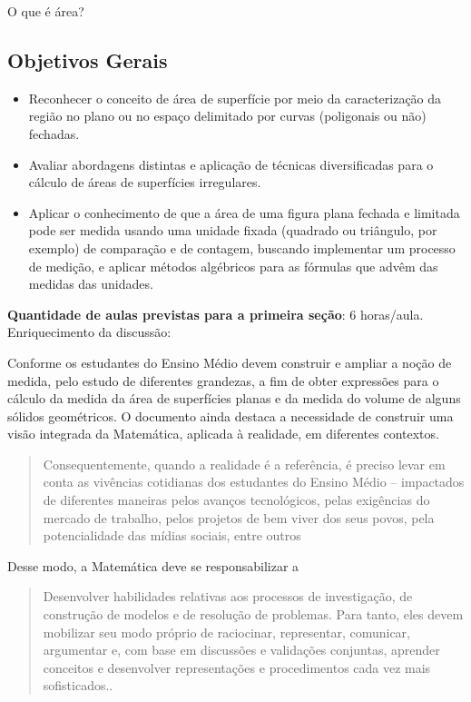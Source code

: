 \begin{paginatexto}{O que é área?}
\subsection{Objetivos Gerais}

\begin{itemize}
\item Reconhecer o conceito de área de superfície por meio da caracterização da região no plano ou no espaço delimitado por curvas (poligonais ou não) fechadas.
\item Avaliar abordagens distintas e aplicação de técnicas diversificadas para o cálculo de áreas de superfícies irregulares.
\item Aplicar o conhecimento de que a área de uma figura plana fechada e limitada pode ser medida usando uma unidade fixada (quadrado ou triângulo, por exemplo) de comparação e de contagem, buscando implementar um processo de medição, e aplicar métodos algébricos para as fórmulas que advêm das medidas das unidades.
\end{itemize}

\textbf{Quantidade de aulas previstas para a primeira seção}: 6 horas/aula.
Enriquecimento da discussão:

Conforme \citet{BNCC2019} os estudantes do Ensino Médio devem construir e ampliar a noção de medida, pelo estudo de diferentes grandezas, a fim de obter expressões para o cálculo da medida da área de superfícies planas e da medida do volume de alguns sólidos geométricos. O documento ainda destaca a necessidade de construir uma visão integrada da Matemática, aplicada à realidade, em diferentes contextos.

\begin{quote}
Consequentemente, quando a realidade é a referência, é preciso levar em conta as vivências cotidianas dos estudantes do Ensino Médio – impactados de diferentes maneiras pelos avanços tecnológicos, pelas exigências do mercado de trabalho, pelos projetos de bem viver dos seus povos, pela potencialidade das mídias sociais, entre outros \citep[p. 528]{BNCC2019}
\end{quote}

Desse modo, a Matemática deve se responsabilizar a 

\begin{quote}
Desenvolver habilidades relativas aos processos de investigação, de construção de modelos e de resolução de problemas. Para tanto, eles devem mobilizar seu modo próprio de raciocinar, representar, comunicar, argumentar e, com base em discussões e validações conjuntas, aprender conceitos e desenvolver representações e procedimentos cada vez mais sofisticados.\citep[p. 529]{BNCC2019}.
\end{quote}


\end{paginatexto}
